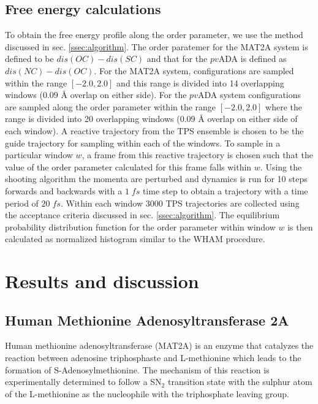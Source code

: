 \documentclass[journal=jpcbfk,manuscript=article,layout=traditional]{achemso}
\begin{document}
\subsection{Free energy calculations}
To obtain the free energy profile along the order parameter, we use the method 
discussed in sec. \ref{ssec:algorithm}. The order paratemer for the MAT2A system 
is defined to be $dis(OC)-dis(SC)$ and that for the $pv$ADA is defined as 
$dis(NC)-dis(OC)$. For the MAT2A system, configurations are sampled within 
the range $[-2.0,2.0]$ and this range is divided into 14 overlapping windows 
($0.09$ {\AA} overlap on either side). For the $pv$ADA system configurations are
sampled along the order parameter within the range $[-2.0, 2.0]$ where the range is
divided into 20 overlapping windows ($0.09$ {\AA} overlap on either side of each window). 
A reactive trajectory from the TPS ensemble is chosen to be the guide trajectory 
for sampling within each of the windows. To sample in a particular window $w$, a 
frame from this reactive trajectory is chosen such that the value of the 
order parameter calculated for this frame falls within $w$. Using the shooting algorithm
the momenta are perturbed and dynamics is run for 10 steps forwards and backwards with a 
$1\;fs$ time step to obtain a trajectory with a time period of $20\;fs$.    
Within each window 3000 TPS trajectories are collected using the acceptance criteria 
discussed in sec. \ref{ssec:algorithm}. The equilibrium probability distribution function 
for the order parameter within window $w$ is then calculated as normalized histogram
similar to the WHAM procedure. \cite{Kumar92JComputChem13p1011}
\section{Results and discussion}
\subsection{Human Methionine Adenosyltransferase 2A}
Human methionine adenosyltransferase (MAT2A) is an enzyme that catalyzes the 
reaction between adenosine triphosphaste and L-methionine which leads to the 
formation of S-Adenosylmethionine. \cite{Firestone17JAmChemSoc139p13754,Niland21Biochem60p791} 
The mechanism of this reaction is experimentally determined to follow a 
SN$_2$ transition state with the sulphur atom of the L-methionine as the 
nucleophile with the triphosphate leaving group.  
\end{document}
